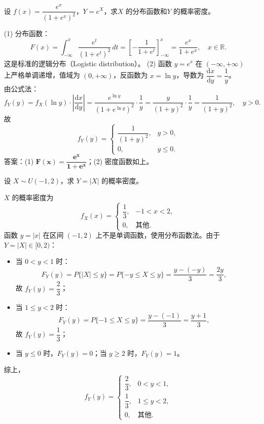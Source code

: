 \documentclass[lang=cn,11pt]{elegantbook}
\begin{document}
\begin{exercise}[逻辑分布变换] \label{exer:2-50}
设 $f(x)=\dfrac{e^x}{(1+e^x)^2}$，$Y=e^X$，求$X$ 的分布函数和$Y$ 的概率密度。
\end{exercise}
\begin{solution}
(1) 分布函数：
\[
F(x) = \int_{-\infty}^{x} \frac{e^t}{(1+e^t)^2}\,dt = \left[-\frac{1}{1+e^t}\right]_{-\infty}^{x} = \frac{e^x}{1+e^x}, \quad x\in\mathbb{R}.
\]
这是标准的逻辑分布（Logistic distribution）。
(2) 函数 $y=e^x$ 在 $(-\infty,+\infty)$ 上严格单调递增，值域为 $(0,+\infty)$，反函数为 $x=\ln y$，导数为 $\dfrac{\mathrm{d}x}{\mathrm{d}y}=\dfrac{1}{y}$。\\
由公式法：
\[
f_Y(y) = f_X(\ln y) \cdot \left|\frac{\mathrm{d}x}{\mathrm{d}y}\right| = \frac{e^{\ln y}}{(1+e^{\ln y})^2} \cdot \frac{1}{y} = \frac{y}{(1+y)^2} \cdot \frac{1}{y} = \frac{1}{(1+y)^2}, \quad y>0.
\]
故
\[
f_Y(y)=
\begin{cases}
\dfrac{1}{(1+y)^2}, & y>0, \\[6pt]
0, & y\leqslant0.
\end{cases}
\]
答案：(1) $\boldsymbol{F(x)=\dfrac{e^x}{1+e^x}}$；(2) 密度函数如上。
\end{solution}


\begin{exercise}[均匀分布绝对值变换] \label{exer:2-51}
设 $X\sim U(-1,2)$，求 $Y=|X|$ 的概率密度。
\end{exercise}
\begin{solution}
$X$ 的概率密度为
\[
f_X(x)=
\begin{cases}
\dfrac{1}{3}, & -1<x<2, \\[6pt]
0, & \text{其他}.
\end{cases}
\]
函数 $y=|x|$ 在区间 $(-1,2)$ 上不是单调函数，使用分布函数法。由于 $Y=|X|\in[0,2)$：
\begin{itemize}
    \item 当 $0<y<1$ 时：
    \[
    F_Y(y) = P\{|X|\leqslant y\} = P\{-y\leqslant X\leqslant y\} = \frac{y-(-y)}{3} = \frac{2y}{3},
    \]
    故 $f_Y(y)=\dfrac{2}{3}$；
    \item 当 $1\leqslant y<2$ 时：
    \[
    F_Y(y) = P\{-1\leqslant X\leqslant y\} = \frac{y-(-1)}{3} = \frac{y+1}{3},
    \]
    故 $f_Y(y)=\dfrac{1}{3}$；
    \item 当 $y\leqslant0$ 时，$F_Y(y)=0$；当 $y\geqslant2$ 时，$F_Y(y)=1$。
\end{itemize}
综上，
\[
f_Y(y)=
\begin{cases}
\dfrac{2}{3}, & 0<y<1, \\[6pt]
\dfrac{1}{3}, & 1\leqslant y<2, \\[6pt]
0, & \text{其他}.
\end{cases}
\]
\end{solution}
\end{document}
